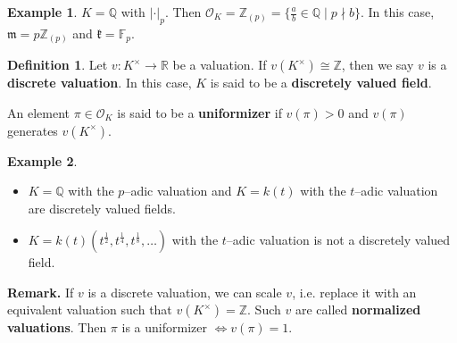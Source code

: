 \documentclass{article}
\theoremstyle{definition}
\newtheorem{example}{Example}[section]
\newtheorem{defn}{Definition}[section]
\begin{document}
\begin{example}
    $K=\mathbb{Q}$ with $|\cdot|_p$. Then $\mathcal{O}_K = \mathbb{Z}_{(p)} = \{\frac{a}{b} \in \mathbb{Q} \mid p \nmid b\}$. In this case, $\mathfrak{m} = p\mathbb{Z}_{(p)}$ and $\mathfrak{k} = \mathbb{F}_p$.
\end{example}

\begin{defn}
    Let $v:K^{\times} \to \mathbb{R}$ be a valuation. If $v(K^{\times}) \cong \mathbb{Z}$, then we say $v$ is a \textbf{discrete valuation}. In this case, $K$ is said to be a \textbf{discretely valued field}. 
    \vspace{1mm}
     
    An element $\pi \in \mathcal{O}_K$ is said to be a \textbf{uniformizer} if $v(\pi)>0$ and $v(\pi)$ generates $v(K^\times)$.
\end{defn}
\begin{example}
    \begin{itemize}
        \item $K=\mathbb{Q}$ with the $p$--adic valuation and $K=k(t)$ with the $t$--adic valuation are discretely valued fields.
        \item $K=k(t)(t^{\frac{1}{2}}, t^{\frac{1}{4}}, t^{\frac{1}{8}},\ldots)$ with the $t$--adic valuation is not a discretely valued field.
    \end{itemize}
\end{example}
\textbf{Remark.} If $v$ is a discrete valuation, we can scale $v$, i.e. replace it with an equivalent valuation such that $v(K^\times) = \mathbb{Z}$. Such $v$ are called \textbf{normalized valuations}. Then $\pi$ is a uniformizer $\iff v(\pi) = 1$.
\end{document}
